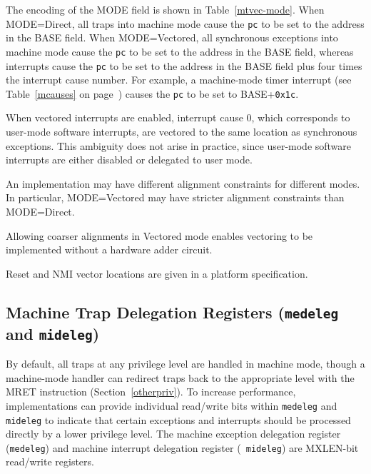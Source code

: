 The encoding of the MODE field is shown in Table~\ref{mtvec-mode}.  When
MODE=Direct, all traps into machine mode cause the {\tt pc} to be set to the
address in the BASE field.  When MODE=Vectored, all synchronous exceptions
into machine mode cause the {\tt pc} to be set to the address in the BASE
field, whereas interrupts cause the {\tt pc} to be set to the address in
the BASE field plus four times the interrupt cause number.  For example,
a machine-mode timer interrupt (see Table~\ref{mcauses} on page~\pageref{mcauses}) causes the {\tt pc}
to be set to BASE+{\tt 0x1c}.

\begin{commentary}
When vectored interrupts are enabled, interrupt cause 0, which corresponds to
user-mode software interrupts, are vectored to the same location as
synchronous exceptions.  This ambiguity does not arise in practice, since
user-mode software interrupts are either disabled or delegated to user mode.
\end{commentary}

An implementation may have different alignment constraints for
different modes.  In particular, MODE=Vectored may have stricter
alignment constraints than MODE=Direct.

\begin{commentary}
  Allowing coarser alignments in Vectored mode enables vectoring to be
  implemented without a hardware adder circuit.
\end{commentary}

\begin{commentary}
Reset and NMI vector locations are given in a platform specification.
\end{commentary}

\subsection{Machine Trap Delegation Registers ({\tt medeleg} and {\tt mideleg})}

By default, all traps at any privilege level are handled in machine
mode, though a machine-mode handler can redirect traps back to the
appropriate level with the MRET instruction (Section~\ref{otherpriv}).
To increase performance, implementations can provide individual
read/write bits within {\tt medeleg} and {\tt mideleg} to indicate
that certain exceptions and interrupts should be processed directly by
a lower privilege level.  The machine exception delegation register
({\tt medeleg}) and machine interrupt delegation register ({\tt
  mideleg}) are MXLEN-bit read/write registers.


